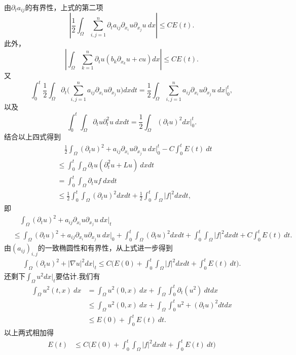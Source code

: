 \begin{itemize}
由$\partial_ta_{ij}$的有界性，上式的第二项
\[\left|\frac{1}{2}\int_\varOmega\sum_{i,j=1}^n\partial_ta_{ij}\partial_{x_i}u\partial_{x_j}u\>dx\right|\leqslant CE(t).\]
此外，
$$\left|\int_\varOmega\sum_{k=1}^n\partial_tu(b_k\partial_{x_k}u+cu)dx\right|\leqslant CE(t).$$
又
$$\int_0^t\frac{1}{2}\int_\varOmega\partial_t\bigg(\sum_{i,j=1}^na_{ij}\partial_{x_i}u\partial_{x_j}u\bigg)dxdt
=\frac{1}{2}\int_\varOmega\sum_{i,j=1}^na_{ij}\partial_{x_i}u\partial_{x_j}u\>dx\Big|_{0}^t,$$
以及
$$\int_0^t\int_\varOmega\partial_tu\partial^2_tu\>dxdt
=\frac{1}{2}\int_\varOmega(\partial_tu)^2dx\Big|_{0}^t.$$
结合以上四式得到
\begin{align*}    
    &\quad\frac{1}{2}\int_\varOmega(\partial_tu)^2
    +a_{ij}\partial_{x_i}u\partial_{x_j}u\>dx\Big|_{0}^t
    -C\int_0^t\!E(t)\>dt\\
    &\leqslant\int_0^t\int_\varOmega\partial_tu(\partial^2_tu+Lu)\>dxdt\\
    &=\int_0^t\int_\varOmega\partial_t uf\>dxdt\\
    &\leqslant\frac{1}{2}\int_0^t\int_\varOmega(\partial_t u)^2dxdt
    +\frac{1}{2}\int_0^t\int_\varOmega|f|^2dxdt,
\end{align*}
即
\begin{align*}
    &\quad\int_\varOmega(\partial_tu)^2+a_{ij}\partial_{x_i}u\partial_{x_j}u\>dx\Big|_{t}\\
    &\leqslant\int_\varOmega(\partial_tu)^2+a_{ij}\partial_{x_i}u\partial_{x_j}u\>dx\Big|_{0}
    +\int_0^t\int_\varOmega(\partial_t u)^2dxdt
    +\int_0^t\int_\varOmega|f|^2dxdt+C\int_0^t\!E(t)\>dt.
\end{align*}
由$(a_{ij})_{i,j}$的一致椭圆性和有界性，从上式进一步得到
\begin{align*}
    \int_\varOmega(\partial_tu)^2+|\nabla u|^2dx\Big|_{t}
    \leqslant C\big(E(0)
    +\int_0^t\int_\varOmega|f|^2dxdt+\int_0^t\!E(t)\>dt\big).
\end{align*}
还剩下$\displaystyle \int_{\varOmega} u^2dx\Big|_{t}$要估计.我们有
\begin{align*}
    \int_\varOmega u^2(t,x)\>dx
    &=\int_\varOmega u^2(0,x)\>dx+\int_\varOmega\int_0^t\partial_t(u^2)\>dtdx\\
    &\leqslant\int_\varOmega u^2(0,x)\>dx+\int_\varOmega\int_0^t u^2+(\partial_t u)^2dtdx\\
    &\leqslant E(0)+\int_0^t\!E(t)\>dt.
\end{align*}
以上两式相加得
\begin{align*}
    E(t)&\leqslant C\big(E(0)+
    \int_0^t\int_\varOmega|f|^2dxdt+\int_0^t\!E(t)\>dt\big)\\

\end{align*}
\end{itemize}
